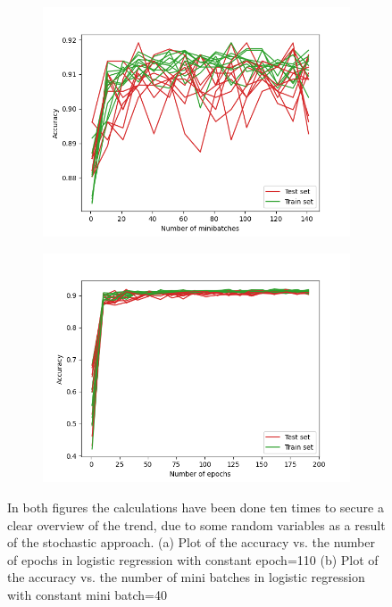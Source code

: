 \documentclass[../main.tex]{subfiles}
\begin{document}
\begin{figure}[H] 
   \centering
   \begin{subfigure}[b]{0.80\textwidth}
      \centering
    \includegraphics[width=\textwidth]{../assets/acc_vs_mb_set_40.png}
    \caption{}
    \label{fig:accvsepoch}
   \end{subfigure}
   \quad
   \begin{subfigure}[b]{0.80\textwidth}
    \centering
    \includegraphics[width=\textwidth]{../assets/acc_vs_epoch_set_110.png} 
    \caption{}
    \label{fig:accvsmini}
   \end{subfigure}
   \caption{In both figures the calculations have been done ten times to secure a clear overview of the trend, due to some random variables as a result of the stochastic approach. (a) Plot of the accuracy vs. the number of epochs in logistic regression with constant epoch=110 (b) Plot of the accuracy vs. the number of mini batches in logistic regression with constant mini batch=40
   }
   \label{fig:accvsepochvsmb}
\end{figure} 
\end{document}
